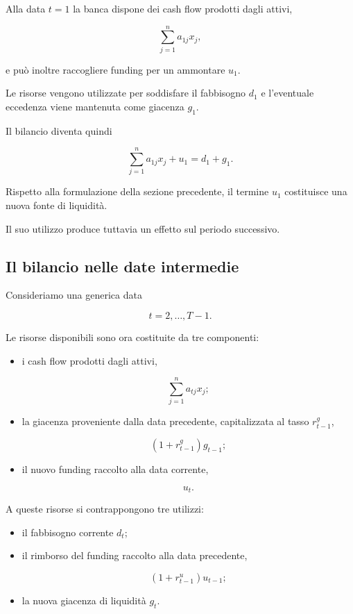 Alla data $t=1$ la banca dispone dei cash flow prodotti dagli attivi,

\[
\sum_{j=1}^{n}a_{1j}x_j,
\]

\noindent e pu\`o inoltre raccogliere funding per un ammontare $u_1$.

Le risorse vengono utilizzate per soddisfare il fabbisogno $d_1$ e
l'eventuale eccedenza viene mantenuta come giacenza $g_1$.

Il bilancio diventa quindi

\[
\sum_{j=1}^{n}a_{1j}x_j
+
u_1
=
d_1+g_1.
\]

Rispetto alla formulazione della sezione precedente, il termine $u_1$
costituisce una nuova fonte di liquidit\`a.

Il suo utilizzo produce tuttavia un effetto sul periodo successivo.

\subsection{Il bilancio nelle date intermedie}

Consideriamo una generica data

\[
t=2,\ldots,T-1.
\]

Le risorse disponibili sono ora costituite da tre componenti:

\begin{itemize}

\item i cash flow prodotti dagli attivi,

\[
\sum_{j=1}^{n}a_{tj}x_j;
\]

\item la giacenza proveniente dalla data precedente, capitalizzata al tasso
$r^g_{t-1}$,

\[
(1+r^g_{t-1})g_{t-1};
\]

\item il nuovo funding raccolto alla data corrente,

\[
u_t.
\]

\end{itemize}

A queste risorse si contrappongono tre utilizzi:

\begin{itemize}

\item il fabbisogno corrente $d_t$;

\item il rimborso del funding raccolto alla data precedente,

\[
(1+r^u_{t-1})u_{t-1};
\]

\item la nuova giacenza di liquidit\`a $g_t$.

\end{itemize}

